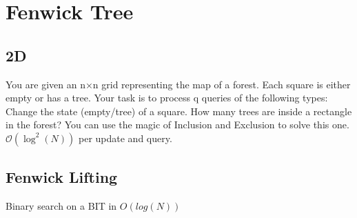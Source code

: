 \section{Fenwick Tree}
\subsection{2D}

You are given an n×n grid representing the map of a forest. Each square is either empty or has a tree. Your task is to process q queries of the following types:
Change the state (empty/tree) of a square.
How many trees are inside a rectangle in the forest? You can use the magic of Inclusion and Exclusion to solve this one. $\mathcal{O}(\log^2(N))$ per update and query.


\subsection{Fenwick Lifting}
Binary search on a BIT in $O(log(N))$


